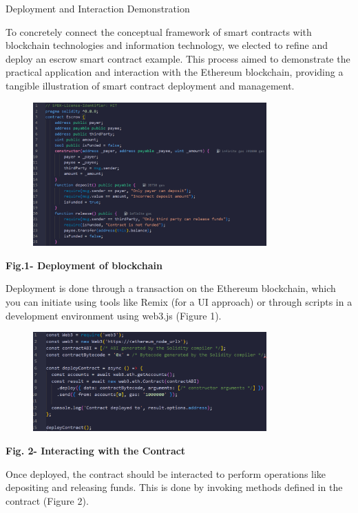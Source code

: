Deployment and Interaction Demonstration

To concretely connect the conceptual framework of smart contracts with
blockchain technologies and information technology, we elected to refine
and deploy an escrow smart contract example. This process aimed to
demonstrate the practical application and interaction with the Ethereum
blockchain, providing a tangible illustration of smart contract
deployment and management.

\begin{figure}[H]
	\centering
	\includegraphics[width=0.8\textwidth]{assets/78}
	\caption*{}
\end{figure}

\textbf{Fig.1- Deployment of blockchain}

Deployment is done through a transaction on the Ethereum blockchain,
which you can initiate using tools like Remix (for a UI approach) or
through scripts in a development environment using web3.js (Figure 1).

\begin{figure}[H]
	\centering
	\includegraphics[width=0.8\textwidth]{assets/79}
	\caption*{}
\end{figure}

\textbf{Fig. 2- Interacting with the Contract}

Once deployed, the contract should be interacted to perform operations
like depositing and releasing funds. This is done by invoking methods
defined in the contract (Figure 2).

